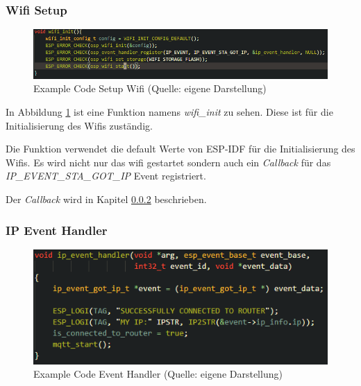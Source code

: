 \subsubsection{Wifi Setup}

\begin{figure}[H]
    \begin{center}
        \includegraphics[scale=0.7]{images/example_code_setup_wifi.png}
        \caption{Example Code Setup Wifi (Quelle: eigene Darstellung)}
        \label{abb:example_code_setup_wifi}
    \end{center}
\end{figure}

In Abbildung \ref{abb:example_code_setup_wifi} ist eine Funktion namens \textit{wifi\_init} zu sehen. Diese ist für die Initialisierung des Wifis zuständig.

Die Funktion verwendet die default Werte von ESP-IDF für die Initialisierung des Wifis.
Es wird nicht nur das wifi gestartet sondern auch ein \textit{Callback} für das \linebreak \textit{IP\_EVENT\_STA\_GOT\_IP} Event registriert.

Der \textit{Callback} wird in Kapitel \ref{sec:example-code-event-handler} beschrieben.

\subsubsection{IP Event Handler}\label{sec:example-code-event-handler}

\begin{figure}[H]
    \begin{center}
        \includegraphics[scale=0.8]{images/example_code_event_handler.png}
        \caption{Example Code Event Handler (Quelle: eigene Darstellung)}
        \label{abb:example_code_event_handler}
    \end{center}
\end{figure}

